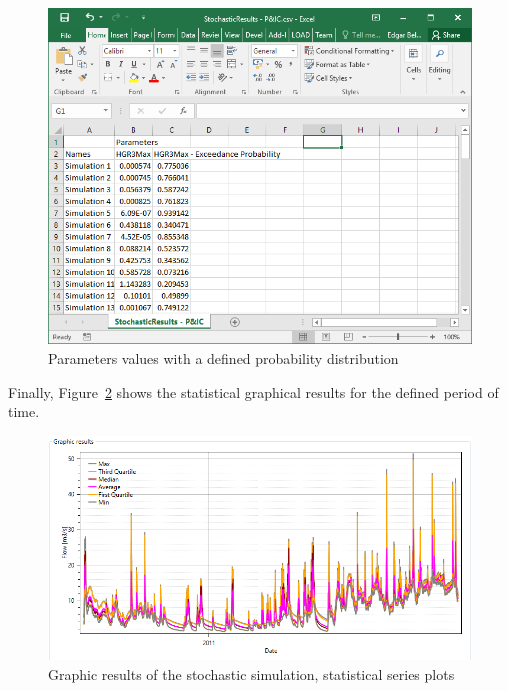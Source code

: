 \documentclass[
  letterpaper,
  DIV=11,
  numbers=noendperiod]{scrreprt}
\begin{document}
\begin{figure}

{\centering \includegraphics{./figures/fig-stochastic_simulation_probability_distribution.png}

}

\caption{\label{fig-stochastic_simulation_probability_distribution}Parameters
values with a defined probability distribution}

\end{figure}

Finally, Figure~\ref{fig-stochastic_simulation_graphical_results} shows
the statistical graphical results for the defined period of time.

\begin{figure}

{\centering \includegraphics{./figures/fig-stochastic_simulation_graphical_results.png}

}

\caption{\label{fig-stochastic_simulation_graphical_results}Graphic
results of the stochastic simulation, statistical series plots}

\end{figure}
\end{document}

